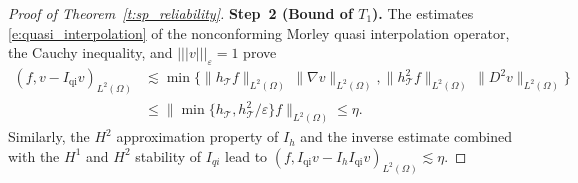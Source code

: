 \documentclass[10pt,a4paper]{amsart}
\newcommand{\ennorm}[1]{\lvert\!\lvert\!\lvert #1 \rvert\!\rvert\!\rvert}
\newcommand{\tri}{\mathcal{T}}
\begin{document}
\begin{proof}[Proof of Theorem~\ref{t:sp_reliability}]
    \textbf{Step~2 (Bound of $T_1$).}
    The estimates 
    \eqref{e:quasi_interpolation}
    of the nonconforming Morley quasi interpolation operator,
    the Cauchy inequality, and $\ennorm{v}_{\varepsilon}=1$ 
    prove
    \begin{align*}
        (f,v-I_\mathrm{qi}v)_{L^2(\Omega)} 
        &\lesssim 
          \min\{\lVert h_\tri f \rVert_{L^2(\Omega)} \,
            \lVert \nabla v \rVert_{L^2(\Omega)},
             \lVert h_\tri^2 f \rVert_{L^2(\Omega)} \,
            \lVert D^2 v \rVert_{L^2(\Omega)}\}\\
        &\leq \lVert\min\{h_\tri,h_\tri^2/\varepsilon\}
           f \rVert_{L^2(\Omega)}
         \leq \eta.
    \end{align*}
    Similarly, the $H^2$ approximation property of $I_h$ and
    the inverse estimate combined with the $H^1$ and $H^2$ stability of 
    $I_{qi}$ lead to
    $
        (f, I_\mathrm{qi}v-I_hI_\mathrm{qi}v)_{L^2(\Omega)}
        \lesssim \eta.
    $
    

\end{proof}
\end{document}
